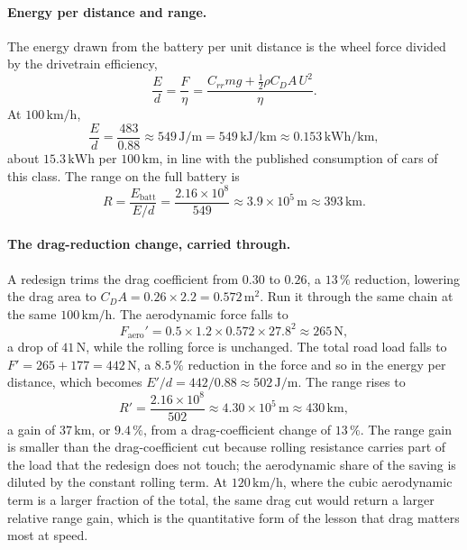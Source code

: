 

\paragraph{Energy per distance and range.} The energy drawn from the
battery per unit distance is the wheel force divided by the drivetrain
efficiency,
\[
\frac{E}{d} = \frac{F}{\eta} = \frac{C_{rr}m g + \tfrac12\rho C_D A\,
U^2}{\eta}.
\]
At $100\,\text{km/h}$,
\[
\frac{E}{d} = \frac{483}{0.88} \approx 549\,\si{\joule\per\meter} =
549\,\si{\kilo\joule\per\kilo\meter} \approx 0.153\,\si{\kilo\watt
\hour\per\kilo\meter},
\]
about $15.3\,\si{\kilo\watt\hour}$ per $100\,\si{\kilo\meter}$, in
line with the published consumption of cars of this class. The range
on the full battery is
\[
R = \frac{E_{\text{batt}}}{E/d} = \frac{2.16\times10^{8}}{549}
\approx 3.9\times10^{5}\,\si{\meter} \approx 393\,\si{\kilo\meter}.
\]

\paragraph{The drag-reduction change, carried through.} A redesign
trims the drag coefficient from $0.30$ to $0.26$, a $13\,\%$
reduction, lowering the drag area to $C_D A = 0.26\times2.2 = 0.572\,
\si{\meter\squared}$. Run it through the same chain at the same
$100\,\text{km/h}$. The aerodynamic force falls to
\[
F_{\text{aero}}' = 0.5\times1.2\times0.572\times27.8^2 \approx 265\,
\si{\newton},
\]
a drop of $41\,\si{\newton}$, while the rolling force is unchanged.
The total road load falls to $F' = 265 + 177 = 442\,\si{\newton}$, a
$8.5\,\%$ reduction in the force and so in the energy per distance,
which becomes $E'/d = 442/0.88 \approx 502\,\si{\joule\per\meter}$.
The range rises to
\[
R' = \frac{2.16\times10^{8}}{502} \approx 4.30\times10^{5}\,\si{\meter}
\approx 430\,\si{\kilo\meter},
\]
a gain of $37\,\si{\kilo\meter}$, or $9.4\,\%$, from a drag-coefficient
change of $13\,\%$. The range gain is smaller than the
drag-coefficient cut because rolling resistance carries part of the
load that the redesign does not touch; the aerodynamic share of the
saving is diluted by the constant rolling term. At $120\,\text{km/h}$,
where the cubic aerodynamic term is a larger fraction of the total,
the same drag cut would return a larger relative range gain, which is
the quantitative form of the lesson that drag matters most at speed.

